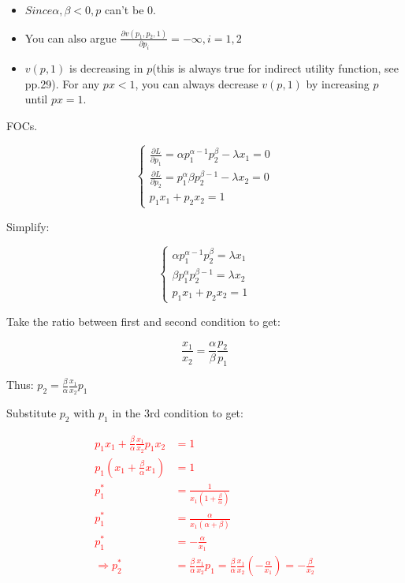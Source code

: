 \documentclass{article}
\begin{document}
\begin{itemize}
\item $Since \alpha, \beta < 0, p$ can't be $0$.

\item You can also argue $\frac{\partial v(p_1,p_2,1)}{\partial p_i} = - \infty, i=1,2$

\item $v(p,1)$ is decreasing in $p$(this is always true for indirect utility function, see pp.29). For any $px<1$, you can always decrease $v(p, 1)$ by increasing $p$ until $px = 1$.
\end{itemize}

FOCs.

\begin{equation}
    \begin{cases}
\frac{\partial L}{\partial p_1} = \alpha p_1^{\alpha - 1} p_2^\beta - \lambda x_1= 0 \\
\frac{\partial L}{\partial p_2} = p_1^{\alpha} \beta p_2^{\beta - 1} - \lambda x_2 = 0 \\
p_1x_1 + p_2x_2 = 1
    \end{cases}
    \nonumber
\end{equation}

Simplify:

\begin{equation}
    \begin{cases}
 \alpha p_1^{\alpha - 1} p_2^\beta = \lambda x_1 \\
 \beta  p_1^{\alpha}  p_2^{\beta - 1} = \lambda x_2  \\
p_1x_1 + p_2x_2 = 1
    \end{cases}
    \label{eq:2_3_foc}   
\end{equation}

Take the ratio between first and second condition to get:

$$\frac{x_1}{x_2} = \frac{\alpha}{\beta} \frac{p_2}{p_1}$$

Thus: $p_2 = \frac{\beta}{\alpha}\frac{x_1}{x_2} p_1 $

Substitute $p_2$ with $p_1$ in the 3rd condition to get:

\textcolor{red}{\begin{align*}
p_1x_1 + \frac{\beta}{\alpha}\frac{x_1}{x_2} p_1  x_2 &= 1 \\
p_1(x_1 + \frac{\beta}{\alpha} x_1) &= 1 \\
p_1^* &= \frac{1}{x_1(1+ \frac{\beta}{\alpha})} \\
p_1^* &= \frac{\alpha}{x_1(\alpha+ \beta)} \\
p_1^* &= -\frac{\alpha}{x_1} \\
\Rightarrow p_2^* &= \frac{\beta}{\alpha} \frac{x_1}{x_2} p_1 =\frac{\beta}{\alpha} \frac{x_1}{x_2}(-\frac{\alpha}{x_1}) = -\frac{\beta}{x_2}
\end{align*}}
\end{document}
